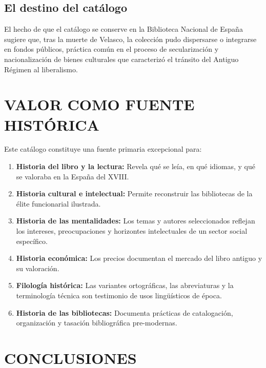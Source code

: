 \documentclass[12pt,a4paper]{article}
\begin{document}
\subsection{El destino del catálogo}

El hecho de que el catálogo se conserve en la Biblioteca Nacional de España sugiere que, tras la muerte de Velasco, la colección pudo dispersarse o integrarse en fondos públicos, práctica común en el proceso de secularización y nacionalización de bienes culturales que caracterizó el tránsito del Antiguo Régimen al liberalismo.

\section{VALOR COMO FUENTE HISTÓRICA}

Este catálogo constituye una fuente primaria excepcional para:

\begin{enumerate}
\item[a)] \textbf{Historia del libro y la lectura:} Revela qué se leía, en qué idiomas, y qué se valoraba en la España del XVIII.

\item[b)] \textbf{Historia cultural e intelectual:} Permite reconstruir las bibliotecas de la élite funcionarial ilustrada.

\item[c)] \textbf{Historia de las mentalidades:} Los temas y autores seleccionados reflejan los intereses, preocupaciones y horizontes intelectuales de un sector social específico.

\item[d)] \textbf{Historia económica:} Los precios documentan el mercado del libro antiguo y su valoración.

\item[e)] \textbf{Filología histórica:} Las variantes ortográficas, las abreviaturas y la terminología técnica son testimonio de usos lingüísticos de época.

\item[f)] \textbf{Historia de las bibliotecas:} Documenta prácticas de catalogación, organización y tasación bibliográfica pre-modernas.
\end{enumerate}

\section{CONCLUSIONES}
\end{document}
